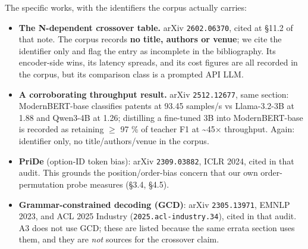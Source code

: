 \documentclass[10pt]{article}
\begin{document}
The specific works, with the identifiers the corpus actually carries:

\begin{itemize}
\item \textbf{The N-dependent crossover table.} arXiv \texttt{2602.06370}\cite{arxiv2602_06370}, cited at \S11.2 of that note. The corpus records \textbf{no title, authors or venue}; we cite the identifier only and flag the entry as incomplete in the bibliography. Its encoder-side wins, its latency spreads, and its cost figures are all recorded in the corpus, but its comparison class is a prompted API LLM.
\item \textbf{A corroborating throughput result.} arXiv \texttt{2512.12677}\cite{arxiv2512_12677}, same section: ModernBERT-base classifies patents at 93.45 samples/s vs Llama-3.2-3B at 1.88 and Qwen3-4B at 1.26; distilling a fine-tuned 3B into ModernBERT-base is recorded as retaining $\ge$ 97 \% of teacher F1 at \textasciitilde{}45$\times$ throughput. Again: identifier only, no title/authors/venue in the corpus.
\item \textbf{PriDe} (option-ID token bias): arXiv \texttt{2309.03882}\cite{pride2309_03882}, ICLR 2024, cited in that audit. This grounds the position/order-bias concern that our own order-permutation probe measures (\S3.4, \S4.5).
\item \textbf{Grammar-constrained decoding (GCD)}: arXiv \texttt{2305.13971}\cite{gcd2305_13971}, EMNLP 2023, and ACL 2025 Industry (\texttt{2025.acl-industry.34}), cited in that audit. A3 does not use GCD; these are listed because the same errata section uses them, and they are \emph{not} sources for the crossover claim.
\end{itemize}
\end{document}
